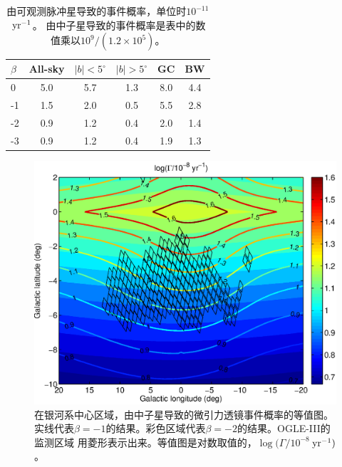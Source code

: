 \begin{table}
\begin{center}
\caption{由可观测脉冲星导致的事件概率，单位时$10^{-11}$\,$\rm{yr^{-1}}$。
由中子星导致的事件概率是表中的数值乘以$10^9/\left(1.2\times10^5\right)$。}
\label{eventRate}
\begin{tabular}{lccccc}
\hline
    $\beta$    &      All-sky  &   $\mid b\mid<5^{\circ}$  & $\mid b\mid>5^{\circ}$  & GC  &  BW        \\
\hline
      0        &      5.0      &    5.7    &  1.3  &  8.0 & 4.4   \\
      -1       &      1.5      &    2.0    &  0.5  &  5.5 & 2.8   \\
      -2       &      0.9      &    1.2    &  0.4  &  2.0 & 1.4   \\
      -3       &      0.9      &    1.2    &  0.4  &  1.9 & 1.3   \\
\hline
\end{tabular}
\end{center}
\end{table}
%
\begin{figure}
\begin{center}
\includegraphics[width=4 in,trim=0 0 0 3cm]{map_event_ns.eps}
\caption{在银河系中心区域，由中子星导致的微引力透镜事件概率的等值图。
实线代表$\beta=-1$的结果。彩色区域代表$\beta=-2$的结果。OGLE-III的监测区域
用菱形表示出来。等值图是对数取值的，$\log(\Gamma/10^{-8}$\,$\rm{yr^{-1}})$。}
\label{map_event}
\end{center}
\end{figure}
%

